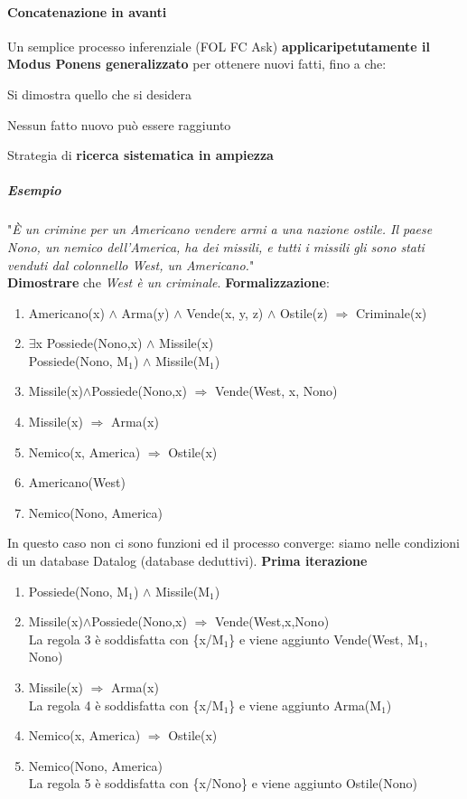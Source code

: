 \documentclass[10pt]{book}
\begin{document}
\paragraph{Concatenazione in avanti} Un semplice processo inferenziale (FOL FC Ask) \textbf{applicaripetutamente il Modus Ponens generalizzato} per ottenere nuovi fatti, fino a che:
\begin{list}{}{}
	\item Si dimostra quello che si desidera
	\item Nessun fatto nuovo può essere raggiunto
\end{list}
Strategia di \textbf{ricerca sistematica in ampiezza}
\subparagraph{Esempio}
"\textit{È un crimine per un Americano vendere armi a una nazione ostile. Il
paese Nono, un nemico dell’America, ha dei missili, e tutti i missili gli
sono stati venduti dal colonnello West, un Americano.}"\\
\textbf{Dimostrare} che \textit{West è un criminale}. \textbf{Formalizzazione}:
\begin{enumerate}
	\item Americano(x) $\wedge$ Arma(y) $\wedge$ Vende(x, y, z) $\wedge$ Ostile(z) $\Rightarrow$ Criminale(x)
	\item $\exists$x Possiede(Nono,x) $\wedge$ Missile(x)\\
	Possiede(Nono, M$_1$) $\wedge$ Missile(M$_1$)
	\item Missile(x)$\wedge$Possiede(Nono,x) $\Rightarrow$ Vende(West, x, Nono)
	\item Missile(x) $\Rightarrow$ Arma(x)
	\item Nemico(x, America) $\Rightarrow$ Ostile(x)
	\item Americano(West)
	\item Nemico(Nono, America)
\end{enumerate}
In questo caso non ci sono funzioni ed il processo converge: siamo nelle condizioni di un database Datalog (database deduttivi). \textbf{Prima iterazione}
\begin{enumerate}
	\item Possiede(Nono, M$_1$) $\wedge$ Missile(M$_1$)
	\item Missile(x)$\wedge$Possiede(Nono,x) $\Rightarrow$ Vende(West,x,Nono)\\
	La regola 3 è soddisfatta con \{x/M$_1$\} e viene aggiunto Vende(West, M$_1$, Nono)
	\item Missile(x) $\Rightarrow$ Arma(x)\\
	La regola 4 è soddisfatta con \{x/M$_1$\} e viene aggiunto Arma(M$_1$)
	\item Nemico(x, America) $\Rightarrow$ Ostile(x)
	\item Nemico(Nono, America)\\
	La regola 5 è soddisfatta con \{x/Nono\} e viene aggiunto Ostile(Nono)
\end{enumerate}
\end{document}
